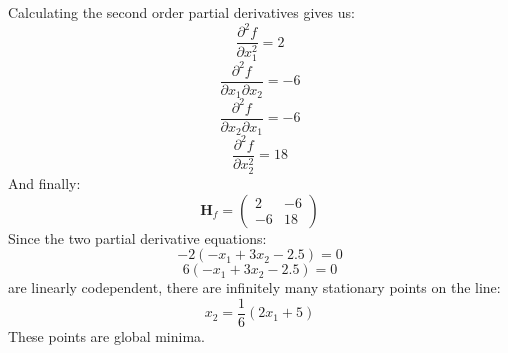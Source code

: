 \documentclass{article}
\begin{document}
Calculating the second order partial derivatives gives us:
\begin{equation*}
    \frac{\partial ^2 f}{\partial x_1^2} = 2
\end{equation*}
\begin{equation*}
    \frac{\partial ^2 f}{\partial x_1 \partial x_2} = -6
\end{equation*}
\begin{equation*}
    \frac{\partial ^2 f}{\partial x_2 \partial x_1} = -6
\end{equation*}
\begin{equation*}
    \frac{\partial ^2 f}{\partial x_2^2} = 18
\end{equation*}
And finally:
\begin{equation*}
    \textbf{H}_f = \begin{pmatrix} 2 & -6 \\ -6 & 18 \end{pmatrix}
\end{equation*}
Since the two partial derivative equations:
\begin{equation*}
    -2(-x_1 + 3x_2 -2.5) = 0
\end{equation*}
\begin{equation*}
     6(-x_1 + 3x_2 -2.5) = 0
\end{equation*}
are linearly codependent, there are infinitely many stationary points on the line:
\begin{equation*}
    x_2 = \frac{1}{6}(2x_1 + 5)
\end{equation*}
These points are global minima.\\
\end{document}
